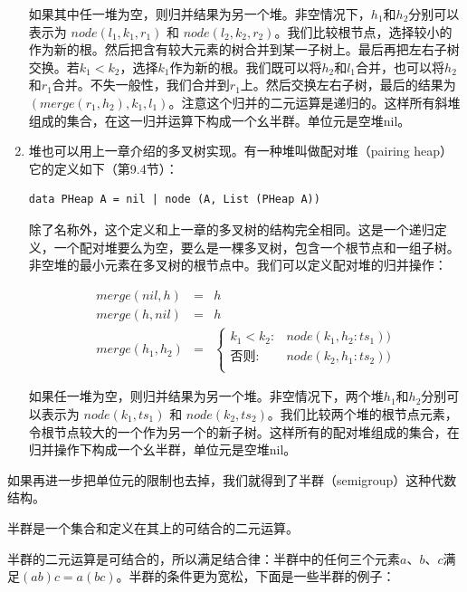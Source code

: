 \documentclass[b5paper]{ctexart}
\begin{document}
\begin{enumerate}
如果其中任一堆为空，则归并结果为另一个堆。非空情况下，$h_1$和$h_2$分别可以表示为 $node(l_1, k_1, r_1)$ 和 $node(l_2, k_2, r_2)$。我们比较根节点，选择较小的作为新的根。然后把含有较大元素的树合并到某一子树上。最后再把左右子树交换。若$k_1 < k_2$，选择$k_1$作为新的根。我们既可以将$h_2$和$l_1$合并，也可以将$h_2$和$r_1$合并。不失一般性，我们合并到$r_1$上。然后交换左右子树，最后的结果为$(merge(r_1, h_2), k_1, l_1)$。注意这个归并的二元运算是递归的。这样所有斜堆组成的集合，在这一归并运算下构成一个幺半群。单位元是空堆nil。

\item 堆也可以用上一章介绍的多叉树实现。有一种堆叫做配对堆（pairing heap）它的定义如下（\cite{LiuXinyu2017}第9.4节）：

\begin{lstlisting}
data PHeap A = nil | node (A, List (PHeap A))
\end{lstlisting}

除了名称外，这个定义和上一章的多叉树的结构完全相同。这是一个递归定义，一个配对堆要么为空，要么是一棵多叉树，包含一个根节点和一组子树。非空堆的最小元素在多叉树的根节点中。我们可以定义配对堆的归并操作：

\[
\begin{array}{rcl}
merge(nil, h) & = & h \\
merge(h, nil) & = & h \\
merge(h_1, h_2) & = &
  \begin{cases}
  k_1 < k_2 : & node(k_1, h_2 : ts_1)) \\
  \text{否则} : & node(k_2, h_1 : ts_2)) \\
  \end{cases}
\end{array}
\]

如果任一堆为空，则归并结果为另一个堆。非空情况下，两个堆$h_1$和$h_2$分别可以表示为 $node(k_1, ts_1)$ 和 $node(k_2, ts_2)$。我们比较两个堆的根节点元素，令根节点较大的一个作为另一个的新子树。这样所有的配对堆组成的集合，在归并操作下构成一个幺半群，单位元是空堆nil。

\end{enumerate}

如果再进一步把单位元的限制也去掉，我们就得到了半群（semigroup）这种代数结构。

\begin{definition}
半群是一个集合和定义在其上的可结合的二元运算。
\end{definition}

半群的二元运算是可结合的，所以满足结合律：半群中的任何三个元素$a$、$b$、$c$满足$(ab)c = a(bc)$。半群的条件更为宽松，下面是一些半群的例子：
\end{document}
